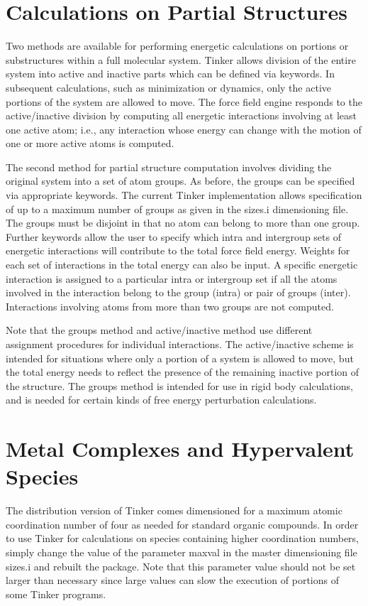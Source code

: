 \documentclass[letterpaper,11pt,english]{sphinxmanual}
\begin{document}
\section{Calculations on Partial Structures}
\label{\detokenize{text/special-features:calculations-on-partial-structures}}
Two methods are available for performing energetic calculations on portions or substructures within a full molecular system. Tinker allows division of the entire system into active and inactive parts which can be defined via keywords. In subsequent calculations, such as minimization or dynamics, only the active portions of the system are allowed to move. The force field engine responds to the active/inactive division by computing all energetic interactions involving at least one active atom; i.e., any interaction whose energy can change with the motion of one or more active atoms is computed.

The second method for partial structure computation involves dividing the original system into a set of atom groups. As before, the groups can be specified via appropriate keywords. The current Tinker implementation allows specification of up to a maximum number of groups as given in the sizes.i dimensioning file. The groups must be disjoint in that no atom can belong to more than one group. Further keywords allow the user to specify which intra\sphinxhyphen{} and intergroup sets of energetic interactions will contribute to the total force field energy. Weights for each set of interactions in the total energy can also be input. A specific energetic interaction is assigned to a particular intra\sphinxhyphen{} or intergroup set if all the atoms involved in the interaction belong to the group (intra\sphinxhyphen{}) or pair of groups (inter\sphinxhyphen{}). Interactions involving atoms from more than two groups are not computed.

Note that the groups method and active/inactive method use different assignment procedures for individual interactions. The active/inactive scheme is intended for situations where only a portion of a system is allowed to move, but the total energy needs to reflect the presence of the remaining inactive portion of the structure. The groups method is intended for use in rigid body calculations, and is needed for certain kinds of free energy perturbation calculations.


\section{Metal Complexes and Hypervalent Species}
\label{\detokenize{text/special-features:metal-complexes-and-hypervalent-species}}
The distribution version of Tinker comes dimensioned for a maximum atomic coordination number of four as needed for standard organic compounds. In order to use Tinker for calculations on species containing higher coordination numbers, simply change the value of the parameter maxval in the master dimensioning file sizes.i and rebuilt the package. Note that this parameter value should not be set larger than necessary since large values can slow the execution of portions of some Tinker programs.
\end{document}
